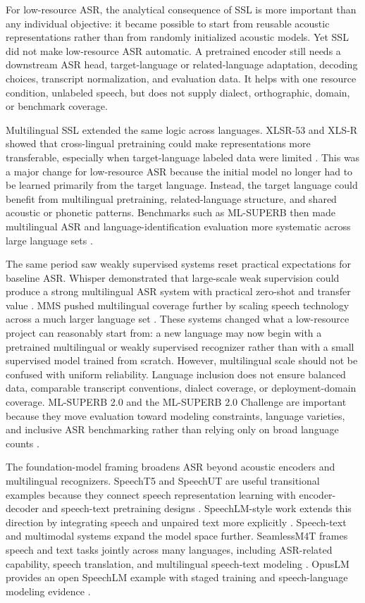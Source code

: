 \documentclass[pdflatex,sn-basic,iicol]{sn-jnl}
\theoremstyle{thmstyleone}
\theoremstyle{thmstyletwo}
\theoremstyle{thmstylethree}
\begin{document}
For low-resource ASR, the analytical consequence of SSL is more important than any individual objective: it became possible to start from reusable acoustic representations rather than from randomly initialized acoustic models. Yet SSL did not make low-resource ASR automatic. A pretrained encoder still needs a downstream ASR head, target-language or related-language adaptation, decoding choices, transcript normalization, and evaluation data. It helps with one resource condition, unlabeled speech, but does not supply dialect, orthographic, domain, or benchmark coverage.

Multilingual SSL extended the same logic across languages. XLSR-53 and XLS-R showed that cross-lingual pretraining could make representations more transferable, especially when target-language labeled data were limited \citep{conneau21_interspeech,babu22_interspeech}. This was a major change for low-resource ASR because the initial model no longer had to be learned primarily from the target language. Instead, the target language could benefit from multilingual pretraining, related-language structure, and shared acoustic or phonetic patterns. Benchmarks such as ML-SUPERB then made multilingual ASR and language-identification evaluation more systematic across large language sets \citep{shi2023mlsuperb}.

The same period saw weakly supervised systems reset practical expectations for baseline ASR. Whisper demonstrated that large-scale weak supervision could produce a strong multilingual ASR system with practical zero-shot and transfer value \citep{pmlr-v202-radford23a}. MMS pushed multilingual coverage further by scaling speech technology across a much larger language set \citep{pratap2024mms}. These systems changed what a low-resource project can reasonably start from: a new language may now begin with a pretrained multilingual or weakly supervised recognizer rather than with a small supervised model trained from scratch. However, multilingual scale should not be confused with uniform reliability. Language inclusion does not ensure balanced data, comparable transcript conventions, dialect coverage, or deployment-domain coverage. ML-SUPERB 2.0 and the ML-SUPERB 2.0 Challenge are important because they move evaluation toward modeling constraints, language varieties, and inclusive ASR benchmarking rather than relying only on broad language counts \citep{shi2024mlsuperb2,chen2025mlsuperb2challenge}.

The foundation-model framing broadens ASR beyond acoustic encoders and multilingual recognizers. SpeechT5 and SpeechUT are useful transitional examples because they connect speech representation learning with encoder-decoder and speech-text pretraining designs \citep{ao2022speecht5,zhang2022speechut}. SpeechLM-style work extends this direction by integrating speech and unpaired text more explicitly \citep{zhang2024_speechlm}. Speech-text and multimodal systems expand the model space further. SeamlessM4T frames speech and text tasks jointly across many languages, including ASR-related capability, speech translation, and multilingual speech-text modeling \citep{seamless2025_joint_speech_text_mt}. OpusLM provides an open SpeechLM example with staged training and speech-language modeling evidence \citep{tian25b_interspeech}.
\end{document}
